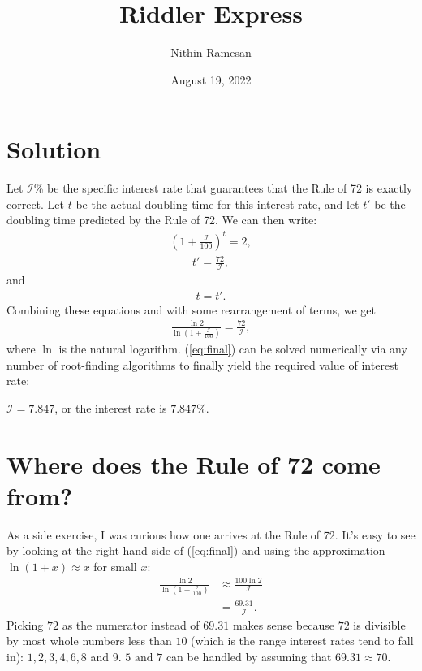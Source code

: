 \documentclass[11pt]{article}
\title{Riddler Express}
\date{August 19, 2022}
\author{Nithin Ramesan}
\theoremstyle{definition}
\begin{document}
	\maketitle
	\section{Solution}
	Let $\mathcal{I}$\% be the specific interest rate that guarantees that the Rule of 72 is exactly correct. Let $t$ be the actual doubling time for this interest rate, and let $t'$ be the doubling time predicted by the Rule of 72. We can then write:
	\begin{align}
		\left(1 + \frac{\mathcal{I}}{100}\right)^t = 2,
	\end{align}
\begin{align}
	t' = \frac{72}{\mathcal{I}},
\end{align}
and
\begin{align}
	t=t'.
\end{align}
Combining these equations and with some rearrangement of terms, we get
\begin{align}
	\label{eq:final}
	\frac{\ln 2}{\ln \left(1 + \frac{\mathcal{I}}{100}\right)} = \frac{72}{\mathcal{I}},
\end{align}
where $\ln$ is the natural logarithm. (\ref{eq:final}) can be solved numerically via any number of root-finding algorithms to finally yield the required value of interest rate:
\begin{center}
	$\mathcal{I}=7.847$, or the interest rate is $7.847$\%.
\end{center}
\section{Where does the Rule of 72 come from?}
As a side exercise, I was curious how one arrives at the Rule of 72. It's easy to see by looking at the right-hand side of (\ref{eq:final}) and using the approximation $\ln(1+x)\approx x$ for small $x$:
\begin{align*}
	\frac{\ln 2}{\ln \left(1 + \frac{\mathcal{I}}{100}\right)} &\approx \frac{100\ln 2}{\mathcal{I}}\\
	&= \frac{69.31}{\mathcal{I}}.
\end{align*}
Picking $72$ as the numerator instead of $69.31$ makes sense because $72$ is divisible by most whole numbers less than $10$ (which is the range interest rates tend to fall in): $1, 2, 3, 4, 6, 8$ and $9$. $5 \text{ and } 7$ can be handled by assuming that $69.31 \approx 70$.
\end{document}
